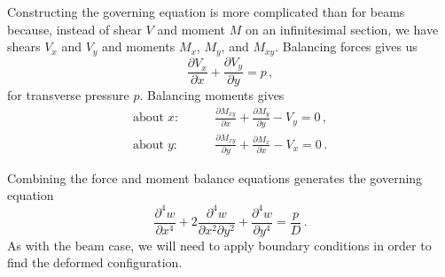 Constructing the governing equation is more complicated than for beams because, instead of shear $V$ and moment $M$ on an infinitesimal section, we have shears $V_x$ and $V_y$ and moments $M_x$, $M_y$, and $M_{xy}$.
Balancing forces gives us
\begin{equation*}
\frac{\partial V_x}{\partial x}+\frac{\partial V_y}{\partial y} = p\, ,
\end{equation*}
for transverse pressure $p$.
Balancing moments gives
\begin{align*}
\text{about} \;x:\qquad& \frac{\partial M_{xy}}{\partial x}+\frac{\partial M_{y}}{\partial y} - V_y = 0\, ,\\
\text{about} \;y:\qquad& \frac{\partial M_{xy}}{\partial y}+\frac{\partial M_{x}}{\partial x} - V_x = 0\, .
\end{align*}

Combining the force and moment balance equations generates the governing equation
\begin{equation*}
\frac{\partial^4w}{\partial x^4}+2\frac{\partial^4w}{\partial x^2 \partial y^2}+\frac{\partial^4w}{\partial y^4}=\frac{p}{D}\, .
\end{equation*}
As with the beam case, we will need to apply boundary conditions in order to find the deformed configuration.

